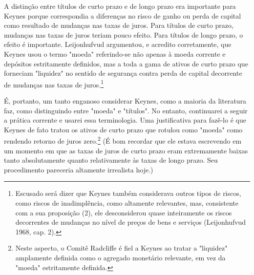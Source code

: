 \documentclass[12pt]{article}
\begin{document}
A distinção entre títulos de curto prazo e de longo prazo era importante para Keynes porque correspondia a diferenças no risco de ganho ou perda de capital como resultado de mudanças nas taxas de juros. Para títulos de curto prazo, mudanças nas taxas de juros teriam pouco efeito. Para títulos de longo prazo, o efeito é importante. Leijonhufvud argumentou, e acredito corretamente, que Keynes usou o termo "moeda" referindo-se não apenas à moeda corrente e depósitos estritamente definidos, mas a toda a gama de ativos de curto prazo que forneciam "liquidez" no sentido de segurança contra perda de capital decorrente de mudanças nas taxas de juros.\footnote{Escusado será dizer que Keynes também considerava outros tipos de riscos, como riscos de inadimplência, como altamente relevantes, mas, consistente com a sua proposição (2), ele desconsiderou quase inteiramente os riscos decorrentes de mudanças no nível de preços de bens e serviços (Leijonhufvud 1968, cap. 2).}

É, portanto, um tanto enganoso considerar Keynes, como a maioria da literatura faz, como distinguindo entre "moeda" e "títulos". No entanto, continuarei a seguir a prática corrente e usarei essa terminologia. Uma justificativa para fazê-lo é que Keynes de fato tratou os ativos de curto prazo que rotulou como "moeda" como rendendo retorno de juros zero.\footnote{Neste aspecto, o Comitê Radcliffe é fiel a Keynes ao tratar a "liquidez" amplamente definida como o agregado monetário relevante, em vez da "moeda" estritamente definida.} (É bom recordar que ele estava escrevendo em um momento em que as taxas de juros de curto prazo eram extremamente baixas tanto absolutamente quanto relativamente às taxas de longo prazo. Seu procedimento pareceria altamente irrealista hoje.)
\end{document}
